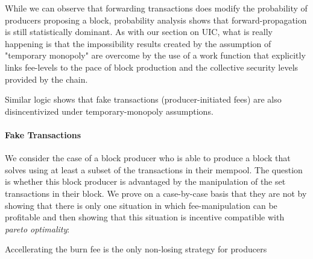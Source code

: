 While we can observe that forwarding transactions does modify the probability of producers proposing a block, probability analysis shows that forward-propagation is still statistically dominant. As with our section on UIC, what is really happening is that the impossibility results created by the assumption of "temporary monopoly" are overcome by the use of a work function that explicitly links fee-levels to the pace of block production and the collective security levels provided by the chain.

Similar logic shows that fake transactions (producer-initiated fees) are also disincentivized under temporary-monopoly assumptions.

\paragraph{Fake Transactions} 

We consider the case of a block producer who is able to produce a block that solves \ourOPT using at least a subset of the transactions in their mempool. The question is whether this block producer is advantaged by the manipulation of the set transactions in their block. We prove on a case-by-case basis that they are not by showing that there is only one situation in which fee-manipulation can be profitable and then showing that this situation is incentive compatible with \textit{pareto optimality}:

\begin{theorem}\label{thm:MIC}
    Accellerating the burn fee is the only non-losing strategy for producers
\end{theorem}


